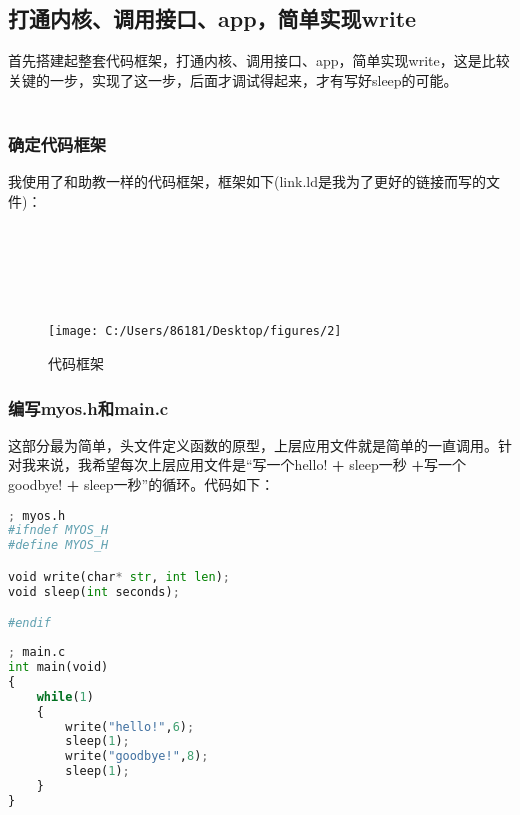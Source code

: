 \documentclass{LabReport}
\begin{document}
	\subsection{打通内核、调用接口、app，简单实现write}
	首先搭建起整套代码框架，打通内核、调用接口、app，简单实现write，这是比较关键的一步，实现了这一步，后面才调试得起来，才有写好sleep的可能。\\\\
	\subsubsection{确定代码框架}
	我使用了和助教一样的代码框架，框架如下(link.ld是我为了更好的链接而写的文件)：\\\\\\\\\\\\

\begin{figure}[h!]
	\centering
	\texttt{[image: C:/Users/86181/Desktop/figures/2]}
	\caption{代码框架}
	\label{fig:2}
\end{figure}
	\subsubsection{编写myos.h和main.c}
	这部分最为简单，头文件定义函数的原型，上层应用文件就是简单的一直调用。针对我来说，我希望每次上层应用文件是``写一个hello! \textbf{+} sleep一秒 \textbf{+}写一个goodbye! \textbf{+} sleep一秒”的循环。代码如下：
	
	\begin{lstlisting}[language=python,frame=shadowbox]
; myos.h
#ifndef MYOS_H
#define MYOS_H

void write(char* str, int len);
void sleep(int seconds);

#endif
	\end{lstlisting}
	
	\begin{lstlisting}[language=python,frame=shadowbox]
; main.c
int main(void)
{   
	while(1)
	{
		write("hello!",6);
		sleep(1);
		write("goodbye!",8);
		sleep(1);
	}
}
	\end{lstlisting}
	
\end{document}
